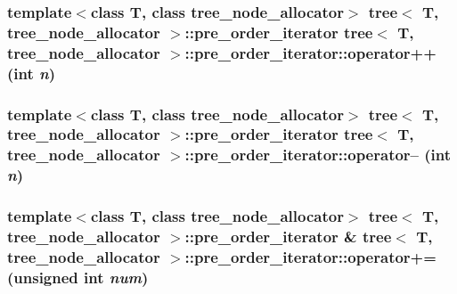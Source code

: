 \hypertarget{classtree_1_1pre__order__iterator_d99a34d4c6cbfaa1de621b276a363856}{
\subsubsection{\setlength{\rightskip}{0pt plus 5cm}template$<$class T, class tree\_\-node\_\-allocator$>$ {\bf tree}$<$ T, tree\_\-node\_\-allocator $>$::{\bf pre\_\-order\_\-iterator} {\bf tree}$<$ T, tree\_\-node\_\-allocator $>$::pre\_\-order\_\-iterator::operator++ (int {\em n})}}
\label{classtree_1_1pre__order__iterator_d99a34d4c6cbfaa1de621b276a363856}


\hypertarget{classtree_1_1pre__order__iterator_9ccab7bd408c6d0a221f69d11f7f3717}{
\subsubsection{\setlength{\rightskip}{0pt plus 5cm}template$<$class T, class tree\_\-node\_\-allocator$>$ {\bf tree}$<$ T, tree\_\-node\_\-allocator $>$::{\bf pre\_\-order\_\-iterator} {\bf tree}$<$ T, tree\_\-node\_\-allocator $>$::pre\_\-order\_\-iterator::operator-- (int {\em n})}}
\label{classtree_1_1pre__order__iterator_9ccab7bd408c6d0a221f69d11f7f3717}


\hypertarget{classtree_1_1pre__order__iterator_5ab66cd50ae22c9b246231b41b7720f5}{
\subsubsection{\setlength{\rightskip}{0pt plus 5cm}template$<$class T, class tree\_\-node\_\-allocator$>$ {\bf tree}$<$ T, tree\_\-node\_\-allocator $>$::{\bf pre\_\-order\_\-iterator} \& {\bf tree}$<$ T, tree\_\-node\_\-allocator $>$::pre\_\-order\_\-iterator::operator+= (unsigned int {\em num})}}
\label{classtree_1_1pre__order__iterator_5ab66cd50ae22c9b246231b41b7720f5}


